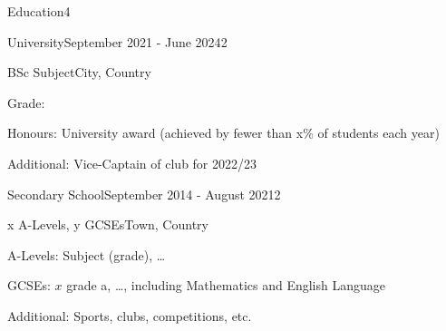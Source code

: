 \documentclass[10pt,a4paper]{CV}
\begin{document}

\begin{Section}{Education}{4}
    \begin{Institution}{University}{September 2021 - June 2024}{2}
        \begin{Position}{BSc Subject}{City, Country}
            \item Grade:
            \item Honours: University award (achieved by fewer than x\% of students each year)
            \item Additional: Vice-Captain of club for 2022/23
        \end{Position}
    \end{Institution}

    \begin{Institution}{Secondary School}{September 2014 - August 2021}{2}
        \begin{Position}{x A-Levels, y GCSEs}{Town, Country}
            \item A-Levels: Subject (grade), \dots
            \item GCSEs: $x$ grade a, \dots, including Mathematics and English Language
            \item Additional: Sports, clubs, competitions, etc.
        \end{Position}
    \end{Institution}
\end{Section}
\end{document}
